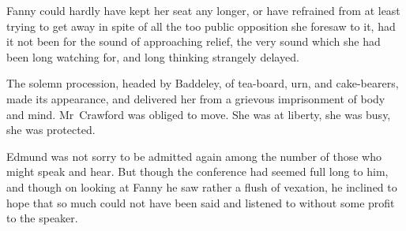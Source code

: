 Fanny could hardly have kept her seat any longer, or have refrained from at least trying to get away in spite of all the too public opposition she foresaw to it, had it not been for the sound of approaching relief, the very sound which she had been long watching for, and long thinking strangely delayed.

The solemn procession, headed by Baddeley, of tea-board, urn, and cake-bearers, made its appearance, and delivered her from a grievous imprisonment of body and mind. Mr~Crawford was obliged to move. She was at liberty, she was busy, she was protected.

Edmund was not sorry to be admitted again among the number of those who might speak and hear. But though the conference had seemed full long to him, and though on looking at Fanny he saw rather a flush of vexation, he inclined to hope that so much could not have been said and listened to without some profit to the speaker. 